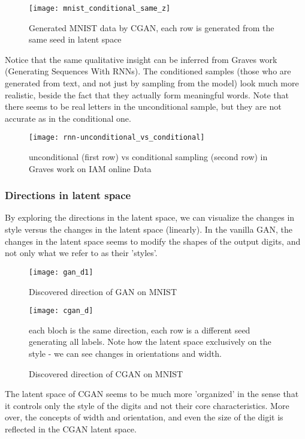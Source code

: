 \begin{figure}[h]
\centering
\texttt{[image: mnist\_conditional\_same\_z]}
\caption{Generated MNIST data by CGAN, each row is generated from the same seed in latent space}
\label{fig:x cubed graph}
\end{figure}


Notice that the same qualitative insight can be inferred from Graves work (Generating Sequences With RNNs). 
The conditioned samples (those who are generated from text, and not just by sampling from the model) look much more realistic, beside the fact that they actually form meaningful words. Note that there seems to be real letters in the unconditional sample, but they are not accurate as in the conditional one.


\begin{figure}[h]
\centering
\texttt{[image: rnn-unconditional\_vs\_conditional]}
\caption{unconditional (first row) vs conditional sampling (second row) in Graves work on IAM online Data}
\label{fig:x cubed graph}
\end{figure}


\subsubsection{Directions in latent space}


By exploring the directions in the latent space, we can visualize the changes in style versus the changes in the latent space (linearly).
In the vanilla GAN, the changes in the latent space seems to modify the shapes of the output digits, and not only what we refer to as their 'styles'.



\begin{figure}[h]
\centering
\texttt{[image: gan\_d1]}
\caption{Discovered direction of GAN on MNIST}
\label{fig:x cubed graph}
\end{figure}


\begin{figure}[h]
\centering
\texttt{[image: cgan\_d]}
\caption{Discovered direction of CGAN on MNIST}
\label{fig:x cubed graph}
each bloch is the same direction, each row is a different seed generating all labels. Note how the latent space exclusively on the style - we can see changes in orientations and width.
\end{figure}

The latent space of CGAN seems to be much more 'organized' in the sense that it controls only the style of the digits and not their core characteristics. More over, the concepts of width and orientation, and even the size of the digit is reflected in the CGAN latent space. 



